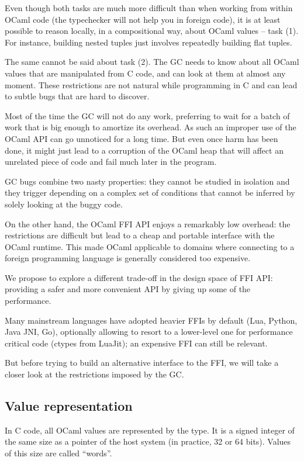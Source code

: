 \documentclass[a4paper]{easychair}
\newcommand{\cpp}[1]{\smash{\lstinline[style=C++]{#1}}}
\begin{document}
Even though both tasks are much more difficult than when working from
within OCaml code (the typechecker will not help you in foreign code),
it is at least possible to reason locally, in a compositional way, about
OCaml values -- task (1). For instance, building nested tuples just
involves repeatedly building flat tuples.

The same cannot be said about task (2). The GC needs to know about all
OCaml values that are manipulated from C code, and can look at them at
almost any moment. These restrictions are not natural while programming
in C and can lead to subtle bugs that are hard to discover.

Most of the time the GC will not do any work, preferring to wait for a
batch of work that is big enough to amortize its overhead. As such an
improper use of the OCaml API can go unnoticed for a long time. But even
once harm has been done, it might just lead to a corruption of the OCaml
heap that will affect an unrelated piece of code and fail much later in the
program.

GC bugs combine two nasty properties: they cannot be studied in
isolation and they trigger depending on a complex set of conditions that
cannot be inferred by solely looking at the buggy code.

On the other hand, the OCaml FFI API enjoys a remarkably low overhead:
the restrictions are difficult but lead to a cheap and portable
interface with the OCaml runtime. This made OCaml applicable to domains
where connecting to a foreign programming language is generally
considered too expensive. %

We propose to explore a different trade-off in the design space of FFI
API: providing a safer and more convenient API by giving up some of the
performance.

Many mainstream languages have adopted heavier FFIs by default (Lua, Python,
Java JNI, Go), optionally allowing to resort to a lower-level one for
performance critical code (ctypes from LuaJit); an expensive FFI can still be
relevant.

But before trying to build an alternative interface to the FFI, we will take a
closer look at the restrictions imposed by the GC.

\subsection{Value representation}

In C code, all OCaml values are represented by the \cpp{value} type. It is a
signed integer of the same size as a pointer of the host system (in practice,
32 or 64 bits). Values of this size are called ``words''.
\end{document}
